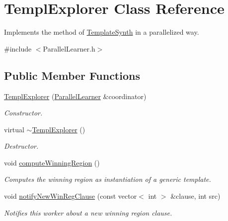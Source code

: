 \hypertarget{classTemplExplorer}{\section{Templ\-Explorer Class Reference}
\label{classTemplExplorer}
}


Implements the method of \hyperlink{classTemplateSynth}{Template\-Synth} in a parallelized way.  




{\ttfamily \#include $<$Parallel\-Learner.\-h$>$}

\subsection*{Public Member Functions}
\begin{DoxyCompactItemize}
\item 
\hyperlink{classTemplExplorer_acce721366cf3d699777e02986745a3db}{Templ\-Explorer} (\hyperlink{classParallelLearner}{Parallel\-Learner} \&coordinator)
\begin{DoxyCompactList}\small\item\em Constructor. \end{DoxyCompactList}\item 
virtual \hyperlink{classTemplExplorer_a7ec547163f5b091983abd4f2e7cd4e6b}{$\sim$\-Templ\-Explorer} ()
\begin{DoxyCompactList}\small\item\em Destructor. \end{DoxyCompactList}\item 
void \hyperlink{classTemplExplorer_a3ed4eef95c846a368f58b0920f381287}{compute\-Winning\-Region} ()
\begin{DoxyCompactList}\small\item\em Computes the winning region as instantiation of a generic template. \end{DoxyCompactList}\item 
void \hyperlink{classTemplExplorer_ad41f5b786618075224aa12db204736fa}{notify\-New\-Win\-Reg\-Clause} (const vector$<$ int $>$ \&clause, int src)
\begin{DoxyCompactList}\small\item\em Notifies this worker about a new winning region clause. \end{DoxyCompactList}\end{DoxyCompactItemize}
